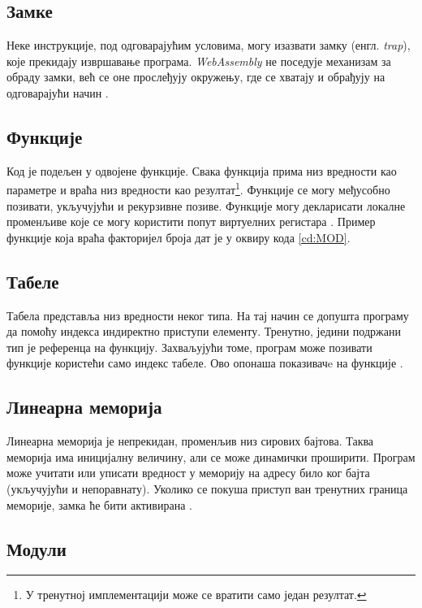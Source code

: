 \documentclass[12pt,oneside]{memoir}
\begin{document}
\subsection{Замке}

Неке инструкције, под одговарајућим условима, могу изазвати замку (енгл. \textit{trap}), које прекидају извршавање
програма. \textit{WebAssembly} не поседује механизам за обраду замки, већ се оне прослеђују окружењу, где се хватају
и обрађују на одговарајући начин \cite{WASMS}.

\subsection{Функције}

Код је подељен у одвојене функције. Свака функција прима низ вредности као параметре и враћа низ вредности као
резултат\footnote{У тренутној имплементацији може се вратити само један резултат.}. Функције се могу међусобно
позивати, укључујући и рекурзивне позиве. Функције могу декларисати локалне променљиве које се могу користити попут
виртуелних регистара \cite{WASMS}. Пример функције која враћа факторијел броја дат је у оквиру кода \ref{cd:MOD}.


\subsection{Табеле}

Табела представља низ вредности неког типа. На тај начин се допушта програму да помоћу индекса индиректно приступи
елементу. Тренутно, једини подржани тип је референца на функцију. Захваљујући томе, програм може позивати функције
користећи само индекс табеле. Ово опонаша показивачe на функције \cite{WASMS}.

\subsection{Линеарна меморија}

Линеарна меморија је непрекидан, променљив низ сирових бајтова. Таква меморија има иницијалну величину, али се може
динамички проширити. Програм може учитати или уписати вредност у меморију на адресу било ког бајта (укључујући и
непоравнату). Уколико се покуша приступ ван тренутних граница меморије, замка ће бити активирана \cite{WASMS}.

\subsection{Модули}
\end{document}
